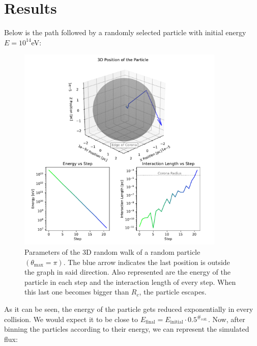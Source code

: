 \chapter{Results}
\label{chap:Results}

Below is the path followed by a randomly selected particle with initial energy $E=10^{14}$eV:

\begin{figure}[H]
    \includegraphics[width=0.88\textwidth]{Figures/example_random_walk.pdf}
    \centering
    \caption{Parameters of the 3D random walk of a random particle $(\theta_{\max}=\pi)$. The blue arrow indicates the last position is outside the graph in said direction. Also represented are the energy of the particle in each step and the interaction length of every step. When this last one becomes bigger than $R_c$, the particle escapes.}
    \label{fig:example_random_walk}
\end{figure}

As it can be seen, the energy of the particle gets reduced exponentially in every collision. We would expect it to be close to $E_\text{final} = E_\text{initial}\cdot 0.5^{\#_\text{coll.}}$. Now, after binning the particles according to their energy, we can represent the simulated flux:

